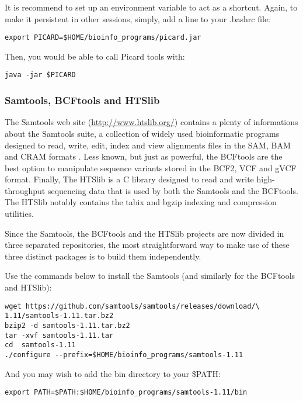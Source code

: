 It is recommend to set up an environment variable to act as a shortcut. Again, to make it persistent in other sessions, simply, add a line to your .bashrc file:

\begin{verbatim}
export PICARD=$HOME/bioinfo_programs/picard.jar
\end{verbatim}

Then, you would be able to call Picard tools with:

\begin{verbatim}
java -jar $PICARD
\end{verbatim}


\subsubsection{Samtools, BCFtools and HTSlib}


The Samtools web site (\href{http://www.htslib.org/}{http://www.htslib.org/}) contains a plenty of informations about the Samtools suite, a collection of widely used bioinformatic programs designed to read, write, edit, index and view alignments files in the SAM, BAM and CRAM formats \cite{Danecek2021}. Less known, but just as powerful, the BCFtools are the best option to manipulate sequence variants stored in the BCF2, VCF and gVCF format. Finally, The HTSlib is a C library designed to read and write high-throughput sequencing data that is used by both the Samtools and the BCFtools. The HTSlib  notably contains the tabix and bgzip indexing and compression utilities.

Since the Samtools, the BCFtools and the HTSlib projects are now divided in three separated repositories, the most straightforward way to make use of these three distinct packages is to build them independently. 

Use the commands below to install the Samtools (and similarly for the BCFtools and HTSlib):

\begin{verbatim}
wget https://github.com/samtools/samtools/releases/download/\
1.11/samtools-1.11.tar.bz2
bzip2 -d samtools-1.11.tar.bz2	
tar -xvf samtools-1.11.tar
cd  samtools-1.11
./configure --prefix=$HOME/bioinfo_programs/samtools-1.11
\end{verbatim}

And you may wish to add the bin directory to your \$PATH:

\begin{verbatim}
export PATH=$PATH:$HOME/bioinfo_programs/samtools-1.11/bin
\end{verbatim}

